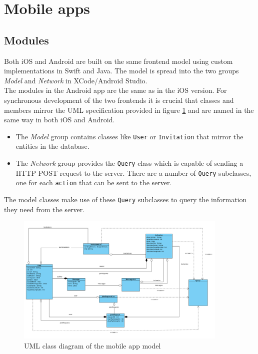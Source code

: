 \documentclass[12pt]{scrartcl}
\begin{document}
\newpage
\section{Mobile apps}

\subsection{Modules}

Both iOS and Android are built on the same frontend model using custom implementations in Swift and Java. The model is spread into the two groups \emph{Model} and \emph{Network} in XCode/Android Studio. \\
The modules in the Android app are the same as in the iOS version. For synchronous development of the two frontends it is crucial that classes and members mirror the UML specification provided in figure \ref{fig:ios-class-diagram} and are named in the same way in both iOS and Android.
\begin{itemize}
	\item 
	The \emph{Model} group contains classes like \texttt{User} or \texttt{Invitation} that mirror the entities in the database.
	
	\item
	The \emph{Network} group provides the \texttt{Query} class which is capable of sending a HTTP POST request to the server. There are a number of \texttt{Query} subclasses, one for each \texttt{action} that can be sent to the server. 
	
\end{itemize}

 The model classes make use of these \texttt{Query} subclasses to query the information they need from the server.

\begin{figure}[h]
	\begin{center}
		\includegraphics[width=0.9\textwidth]{../../spec/components/mobile_app_uml_class.png}
		\caption[UML class diagram of the mobile app model]{UML class diagram of the mobile app model}
		\label{fig:ios-class-diagram}
	\end{center}
\end{figure}
\end{document}
